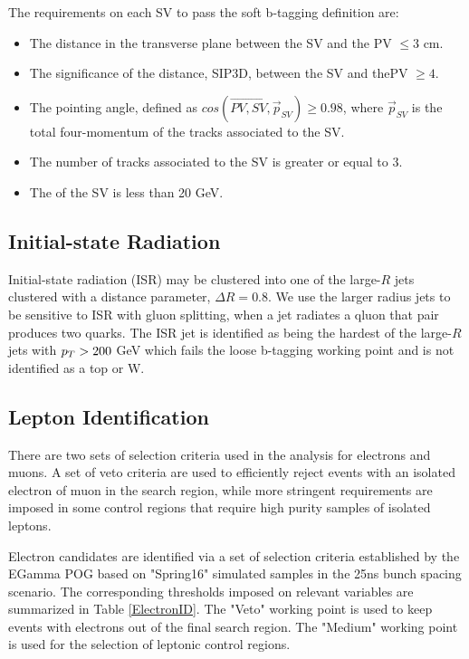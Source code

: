The requirements on each SV to pass the soft b-tagging definition are:
\begin{itemize}
	 \item The distance in the transverse plane between the SV and the PV $\leq3$ cm.
	 \item The significance of the distance, SIP3D, between the SV and thePV $\geq4$.
	 \item The pointing angle, defined as $cos(\overrightarrow{PV,SV},\overrightarrow{p}_{SV})\geq0.98$, where $\overrightarrow{p}_{SV}$ is the total four-momentum of the tracks associated to the SV. 
	 \item The number of tracks associated to the SV is greater or equal to 3.
	 \item The \pt{} of the SV is less than 20 GeV.
\end{itemize}

\subsection{Initial-state Radiation}\label{ISRpt}

Initial-state radiation (ISR) may be clustered into one of the large-$R$ jets clustered with a distance parameter, $\Delta R=0.8$. We use the larger radius jets to be sensitive to ISR with gluon splitting, when a jet radiates a qluon that pair produces two quarks. The ISR jet is identified as being the hardest of the large-$R$ jets with $p_{T}>200$ GeV which fails the loose b-tagging working point and is not identified as a top or W. 
 
 \subsection{Lepton Identification}\label{EleMuonID}
 There are two sets of selection criteria used in the analysis for electrons and muons. A set of veto criteria are used to efficiently reject events with an isolated electron of muon in the search region, while more stringent requirements are imposed in some control regions that require high purity samples of isolated leptons.
 
 Electron candidates are identified via a set of selection criteria established by the EGamma POG based on "Spring16" simulated samples in the 25ns bunch spacing scenario. The corresponding thresholds imposed on relevant variables are summarized in Table \ref{ElectronID}. The "Veto" working point is used to keep events with electrons out of the final search region. The "Medium" working point is used for the selection of leptonic control regions. 
 
